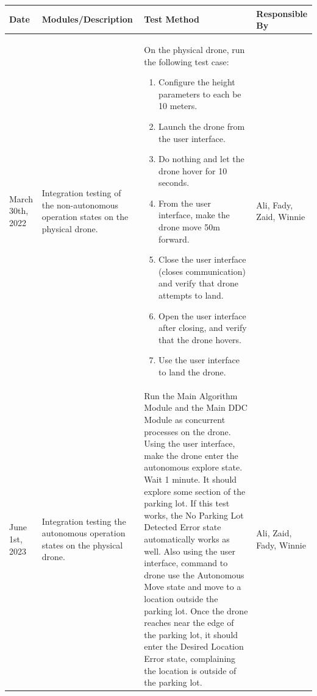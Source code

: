 \documentclass[12pt, titlepage]{article}
\begin{document}
\begin{table}[!h]
\begin{center}
\begin{tabular}{ | m{2.5cm} | m{4cm} | m{6.5cm} | m{2cm} | } 
\hline
Date & Modules/Description & Test Method & Responsible By \\
\hline
March 30th, 2022 & Integration testing of the non-autonomous operation states on the physical drone. & 
    On the physical drone, run the following test case: 
    \begin{enumerate}
    \item Configure the height parameters to each be 10 meters.
    \item Launch the drone from the user interface.
    \item Do nothing and let the drone hover for 10 seconds.
    \item From the user interface, make the drone move 50m forward.
    \item Close the user interface (closes communication) and verify that drone attempts to land.
    \item Open the user interface after closing, and verify that the drone hovers.
    \item Use the user interface to land the drone.
    \end{enumerate}
    & Ali, Fady, Zaid, Winnie \\
\hline
June 1st, 2023 & Integration testing the autonomous operation states on the physical drone. & 
    Run the Main Algorithm Module and the Main DDC Module as concurrent processes on the drone. Using the user interface, make the drone enter the autonomous explore state. Wait 1 minute. It should explore some section of the parking lot. If this test works, the No Parking Lot Detected Error state automatically works as well. Also using the user interface, command to drone use the Autonomous Move state and move to a location outside the parking lot. Once the drone reaches near the edge of the parking lot, it should enter the Desired Location Error state, complaining the location is outside of the parking lot.  & Ali, Zaid, Fady, Winnie \\
\hline
\end{tabular}
\end{center}
\end{table}

\clearpage

% 
\end{document}
